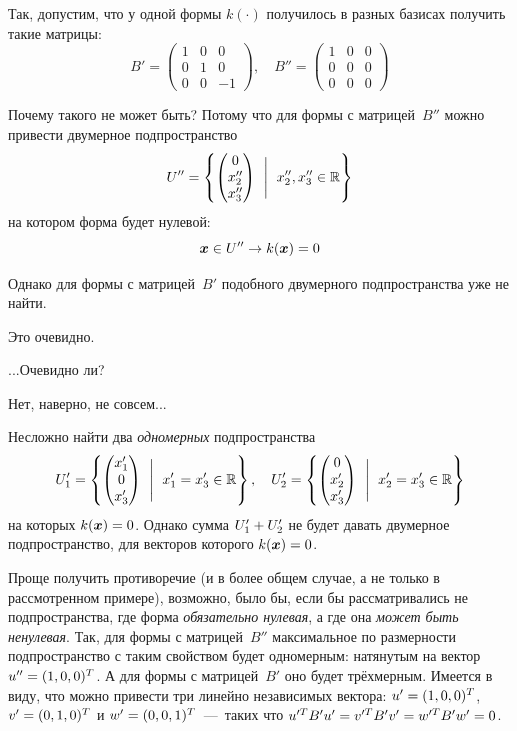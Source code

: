 \documentclass[a4paper,12pt]{article}
\begin{document}
  \begin{example}
    Так, допустим, что у одной формы $k(\cdot)$ получилось в разных базисах получить такие матрицы:
    \[
      B' = \begin{pmatrix}
        1 & 0 & 0\\
        0 & 1 & 0\\
        0 & 0 & -1
      \end{pmatrix},\quad B'' = \begin{pmatrix}
        1 & 0 & 0\\
        0 & 0 & 0\\
        0 & 0 & 0
      \end{pmatrix}
    \]
    
    Почему такого не может быть?
    Потому что для формы с матрицей~$B''$ можно привести двумерное подпространство
    \[
      U'' = \left\{
        \begin{pmatrix}
          0\\
          x_2''\\
          x_3''
        \end{pmatrix}\ \Biggm|\ x_2'', x_3'' \in \operatorname{\mathbb R}
      \right\}
    \]
    на котором форма будет нулевой:
    \[
      \boldsymbol x \in U'' \to k(\boldsymbol x) = 0
    \]
    
    Однако для формы с матрицей~$B'$ подобного двумерного подпространства уже не найти.
    
    Это очевидно.
    
    ...Очевидно ли?
    
    Нет, наверно, не совсем...
    
    Несложно найти два \emph{одномерных} подпространства
    \[
      U_1' = \left\{
        \begin{pmatrix}
          x_1'\\
          0\\
          x_3'
        \end{pmatrix}\ \Biggm|\ x_1' = x_3' \in \operatorname{\mathbb R}
      \right\},\quad U_2' = \left\{
        \begin{pmatrix}
          0\\
          x_2'\\
          x_3'
        \end{pmatrix}\ \Biggm|\ x_2' = x_3' \in \operatorname{\mathbb R}
      \right\}
    \]
    на которых $k(\bds x) \hm= 0$.
    Однако сумма $U_1' \hm+ U_2'$ не будет давать двумерное подпространство, для векторов которого $k(\bds x) \hm= 0$.
    
    Проще получить противоречие (и в более общем случае, а не только в рассмотренном примере), возможно, было бы, если бы рассматривались не подпространства, где форма \emph{обязательно нулевая}, а где она \emph{может быть ненулевая}.
    Так, для формы с матрицей~$B''$ максимальное по размерности подпространство с таким свойством будет одномерным: натянутым на вектор $u'' \hm= (1, 0, 0)^T$.
    А для формы с матрицей~$B'$ оно будет трёхмерным.
    Имеется в виду, что можно привести три линейно независимых вектора: $u' \hm= (1, 0, 0)^T$, $v' \hm= (0, 1, 0)^T$ и $w' \hm= (0, 0, 1)^T$~---~таких что $u^{\prime T} B' u' \hm= v^{\prime T} B' v' \hm= w^{\prime T} B' w' \hm= 0$.
  \end{example}
  
\end{document}

